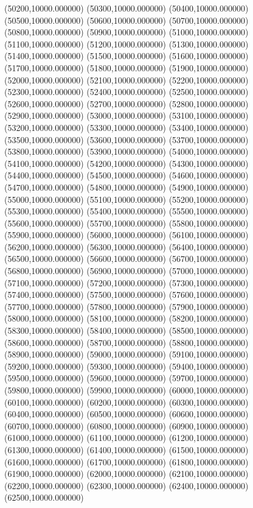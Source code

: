 (50200,10000.000000)
(50300,10000.000000)
(50400,10000.000000)
(50500,10000.000000)
(50600,10000.000000)
(50700,10000.000000)
(50800,10000.000000)
(50900,10000.000000)
(51000,10000.000000)
(51100,10000.000000)
(51200,10000.000000)
(51300,10000.000000)
(51400,10000.000000)
(51500,10000.000000)
(51600,10000.000000)
(51700,10000.000000)
(51800,10000.000000)
(51900,10000.000000)
(52000,10000.000000)
(52100,10000.000000)
(52200,10000.000000)
(52300,10000.000000)
(52400,10000.000000)
(52500,10000.000000)
(52600,10000.000000)
(52700,10000.000000)
(52800,10000.000000)
(52900,10000.000000)
(53000,10000.000000)
(53100,10000.000000)
(53200,10000.000000)
(53300,10000.000000)
(53400,10000.000000)
(53500,10000.000000)
(53600,10000.000000)
(53700,10000.000000)
(53800,10000.000000)
(53900,10000.000000)
(54000,10000.000000)
(54100,10000.000000)
(54200,10000.000000)
(54300,10000.000000)
(54400,10000.000000)
(54500,10000.000000)
(54600,10000.000000)
(54700,10000.000000)
(54800,10000.000000)
(54900,10000.000000)
(55000,10000.000000)
(55100,10000.000000)
(55200,10000.000000)
(55300,10000.000000)
(55400,10000.000000)
(55500,10000.000000)
(55600,10000.000000)
(55700,10000.000000)
(55800,10000.000000)
(55900,10000.000000)
(56000,10000.000000)
(56100,10000.000000)
(56200,10000.000000)
(56300,10000.000000)
(56400,10000.000000)
(56500,10000.000000)
(56600,10000.000000)
(56700,10000.000000)
(56800,10000.000000)
(56900,10000.000000)
(57000,10000.000000)
(57100,10000.000000)
(57200,10000.000000)
(57300,10000.000000)
(57400,10000.000000)
(57500,10000.000000)
(57600,10000.000000)
(57700,10000.000000)
(57800,10000.000000)
(57900,10000.000000)
(58000,10000.000000)
(58100,10000.000000)
(58200,10000.000000)
(58300,10000.000000)
(58400,10000.000000)
(58500,10000.000000)
(58600,10000.000000)
(58700,10000.000000)
(58800,10000.000000)
(58900,10000.000000)
(59000,10000.000000)
(59100,10000.000000)
(59200,10000.000000)
(59300,10000.000000)
(59400,10000.000000)
(59500,10000.000000)
(59600,10000.000000)
(59700,10000.000000)
(59800,10000.000000)
(59900,10000.000000)
(60000,10000.000000)
(60100,10000.000000)
(60200,10000.000000)
(60300,10000.000000)
(60400,10000.000000)
(60500,10000.000000)
(60600,10000.000000)
(60700,10000.000000)
(60800,10000.000000)
(60900,10000.000000)
(61000,10000.000000)
(61100,10000.000000)
(61200,10000.000000)
(61300,10000.000000)
(61400,10000.000000)
(61500,10000.000000)
(61600,10000.000000)
(61700,10000.000000)
(61800,10000.000000)
(61900,10000.000000)
(62000,10000.000000)
(62100,10000.000000)
(62200,10000.000000)
(62300,10000.000000)
(62400,10000.000000)
(62500,10000.000000)
